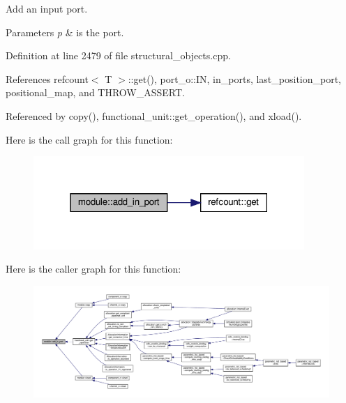 Add an input port. 


\begin{DoxyParams}{Parameters}
{\em p} & is the port. \\
\hline
\end{DoxyParams}


Definition at line 2479 of file structural\+\_\+objects.\+cpp.



References refcount$<$ T $>$\+::get(), port\+\_\+o\+::\+IN, in\+\_\+ports, last\+\_\+position\+\_\+port, positional\+\_\+map, and T\+H\+R\+O\+W\+\_\+\+A\+S\+S\+E\+RT.



Referenced by copy(), functional\+\_\+unit\+::get\+\_\+operation(), and xload().

Here is the call graph for this function\+:
\nopagebreak
\begin{figure}[H]
\begin{center}
\leavevmode
\includegraphics[width=291pt]{d0/dd3/classmodule_a0d2631447deb34621ff56d33e2d9ba13_cgraph}
\end{center}
\end{figure}
Here is the caller graph for this function\+:
\nopagebreak
\begin{figure}[H]
\begin{center}
\leavevmode
\includegraphics[width=350pt]{d0/dd3/classmodule_a0d2631447deb34621ff56d33e2d9ba13_icgraph}
\end{center}
\end{figure}
\mbox{\label{classmodule_a7d1b70b4339dd86910a5d1cbb9ce314f}} 
